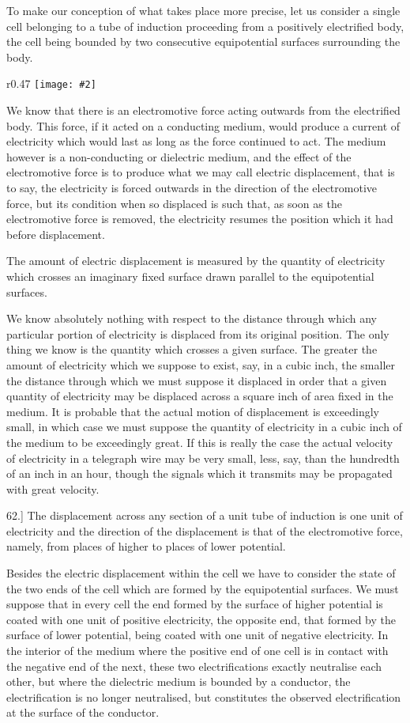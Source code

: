 \documentclass[12pt,oneside]{book}[2021/10/04]
\newcommand{\Runhead}[1]{\fancyhead[C]{\iffloatpage{}{\small#1}}}
\newcommand{\article}[1]{\phantomsection \label{art:#1}{#1.]}}
\newcommand{\wrapfig}[3]{
\begin{wrapfigure}{r}{#1\textwidth}
\centering
\texttt{[image: \#2]}
\caption*{\small #3}
\end{wrapfigure}}
\newcommand{\¬}{\hphantom{0}}
\begin{document}
To make our conception of what takes place more precise, let us
consider a single cell belonging to a tube of induction proceeding
from a positively electrified body, the cell being bounded by two
consecutive equipotential surfaces surrounding the body.

\wrapfig{0.47}{065.png}{Fig. 17.}
We know that there is an electromotive force acting outwards
from the electrified body. This force, if it acted on a conducting
medium, would produce a current of electricity which would last as
long as the force continued to
act. The medium however is
a non-conducting or dielectric
medium, and the effect of the
electromotive force is to produce
what we may call electric displacement,
that is to say, the
electricity is forced outwards in
the direction of the electromotive
force, but its condition when
so displaced is such that, as soon
as the electromotive force is removed, the electricity resumes the
position which it had before displacement.
\Runhead{ELECTRIC DISPLACEMENT.}

The amount of electric displacement is measured by the quantity
of electricity which crosses an imaginary fixed surface drawn parallel
to the equipotential surfaces.

We know absolutely nothing with respect to the distance through
which any particular portion of electricity is displaced from its
original position. The only thing we know is the quantity which
crosses a given surface. The greater the amount of electricity
which we suppose to exist, say, in a cubic inch, the smaller the
distance through which we must suppose it displaced in order that
a given quantity of electricity may be displaced across a square
inch of area fixed in the medium. It is probable that the actual
motion of displacement is exceedingly small, in which case we must
suppose the quantity of electricity in a cubic inch of the medium to
be exceedingly great. If this is really the case the actual velocity
of electricity in a telegraph wire may be very small, less, say, than
the hundredth of an inch in an hour, though the signals which it
transmits may be propagated with great velocity.

\article{62} The displacement across any section of a unit tube of induction
is one unit of electricity and the direction of the displacement
is that of the electromotive force, namely, from places of
higher to places of lower potential.

Besides the electric displacement within the cell we have to
consider the state of the two ends of the cell which are formed by
the equipotential surfaces. We must suppose that in every cell the
end formed by the surface of higher potential is coated with one
unit of positive electricity, the opposite end, that formed by the
surface of lower potential, being coated with one unit of negative
electricity. In the interior of the medium where the positive end
of one cell is in contact with the negative end of the next, these
two electrifications exactly neutralise each other, but where the
dielectric medium is bounded by a conductor, the electrification is
no longer neutralised, but constitutes the observed electrification at
the surface of the conductor.
\end{document}
